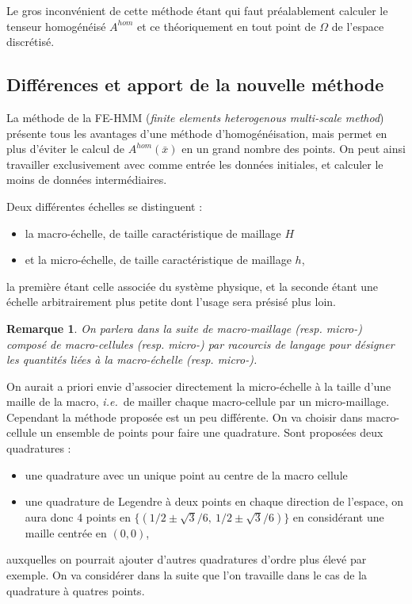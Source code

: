 \documentclass[11pt]{article}
\newtheorem{rmq}{Remarque}
\newcommand{\Ah}{A^{hom}}
\newcommand{\bx}{\bar{x}}
\newcommand{\ie}{\emph{i.e.{}}~}
\begin{document}
Le gros inconvénient de cette méthode étant qui faut préalablement calculer le tenseur homogénéisé $\Ah$ et ce théoriquement en tout point de $\Omega$ de
l'espace discrétisé.


\subsection{Différences et apport de la nouvelle méthode}

La méthode de la FE-HMM (\emph{finite elements heterogenous multi-scale method}) présente tous les avantages d'une méthode d'homogénéisation, mais permet
en plus d'éviter le calcul de $\Ah(\bx)$ en un grand nombre des points. On peut ainsi travailler exclusivement avec comme entrée les données initiales,
et calculer le moins de données intermédiaires.

Deux différentes échelles se distinguent :
\begin{itemize}
\item la macro-échelle, de taille caractéristique de maillage $H$
\item et la micro-échelle, de taille caractéristique de maillage $h$,
\end{itemize}
la première étant celle associée du système physique, et la seconde étant une échelle arbitrairement plus petite dont l'usage sera présisé plus loin.

\begin{rmq}
  On parlera dans la suite de macro-maillage (resp. micro-) composé de macro-cellules (resp. micro-) par racourcis de langage pour désigner
  les quantités liées à la macro-échelle (resp. micro-). 
\end{rmq}

On aurait a priori envie d'associer directement la micro-échelle à la taille d'une maille de la macro, \ie de mailler chaque macro-cellule par un
micro-maillage. Cependant la méthode proposée est un peu différente. On va choisir dans macro-cellule un ensemble de points pour faire une quadrature.
Sont proposées deux quadratures :
\begin{itemize}
\item une quadrature avec un unique point au centre de la macro cellule
\item une quadrature de Legendre à deux points en chaque direction de l'espace, on aura donc 4 points en $\{(1/2 \pm \sqrt{3}/6,~1/2 \pm \sqrt{3}/6)\}$
  en considérant une maille centrée en $(0, 0)$,
\end{itemize}
auxquelles on pourrait ajouter d'autres quadratures d'ordre plus élevé par exemple. On va considérer dans la suite que l'on travaille dans le cas de la
quadrature à quatres points.
\end{document}

